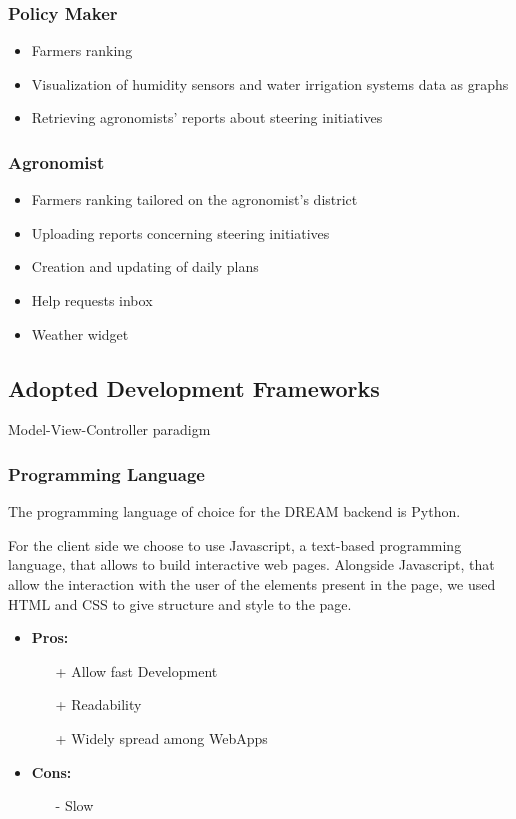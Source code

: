 \documentclass[table, 12pt]{article}
\begin{document}
\subsubsection*{Policy Maker}
\begin{itemize}
    \item Farmers ranking
    \item Visualization of humidity sensors and water irrigation systems data as graphs
    \item Retrieving agronomists' reports about steering initiatives
\end{itemize}
\subsubsection*{Agronomist}
\begin{itemize}
    \item Farmers ranking tailored on the agronomist's district
    \item Uploading reports concerning steering initiatives
    \item Creation and updating of daily plans
    \item Help requests inbox
    \item Weather widget
\end{itemize}
\subsection{Adopted Development Frameworks}
Model-View-Controller paradigm
\subsubsection{Programming Language}
The programming language of choice for the DREAM backend is Python.

For the client side we choose to use Javascript, a text-based programming language, that allows to build interactive web pages.
Alongside Javascript, that allow the interaction with the user of the elements present in the page, we used HTML and CSS to give structure and style to the page.

\begin{itemize}
    \item \textbf{Pros:}
    \begin{itemize}
        \item[+] Allow fast Development
        \item[+] Readability
        \item[+] Widely spread among WebApps  
    \end{itemize}
    \item \textbf{Cons:}
    \begin{itemize}
        \item[-] Slow 
    \end{itemize}
\end{itemize}
\end{document}
